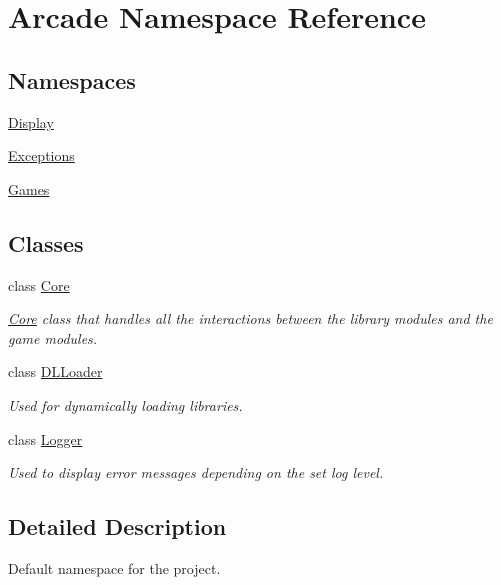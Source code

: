 \hypertarget{namespaceArcade}{}\section{Arcade Namespace Reference}
\label{namespaceArcade}
\subsection*{Namespaces}
\begin{DoxyCompactItemize}
\item 
 \mbox{\hyperlink{namespaceArcade_1_1Display}{Display}}
\item 
 \mbox{\hyperlink{namespaceArcade_1_1Exceptions}{Exceptions}}
\item 
 \mbox{\hyperlink{namespaceArcade_1_1Games}{Games}}
\end{DoxyCompactItemize}
\subsection*{Classes}
\begin{DoxyCompactItemize}
\item 
class \mbox{\hyperlink{classArcade_1_1Core}{Core}}
\begin{DoxyCompactList}\small\item\em \mbox{\hyperlink{classArcade_1_1Core}{Core}} class that handles all the interactions between the library modules and the game modules. \end{DoxyCompactList}\item 
class \mbox{\hyperlink{classArcade_1_1DLLoader}{D\+L\+Loader}}
\begin{DoxyCompactList}\small\item\em Used for dynamically loading libraries. \end{DoxyCompactList}\item 
class \mbox{\hyperlink{classArcade_1_1Logger}{Logger}}
\begin{DoxyCompactList}\small\item\em Used to display error messages depending on the set log level. \end{DoxyCompactList}\end{DoxyCompactItemize}


\subsection{Detailed Description}
Default namespace for the project. 